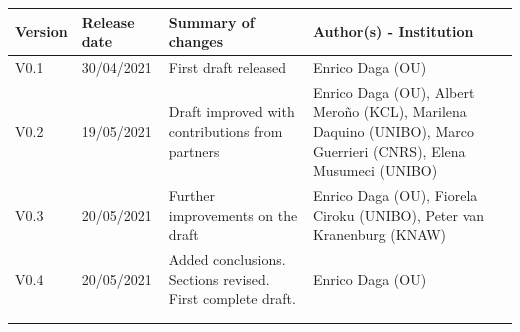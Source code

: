 \begin{tabular}{|l|l|p{5.5cm}|p{5.5cm}|}\hline
  \textbf{Version} & \textbf{Release date} & \textbf{Summary of changes} & \textbf{Author(s) - Institution}\\\hline  
  V0.1 & 30/04/2021 & First draft released & Enrico Daga (OU)\\\hline  
  V0.2 & 19/05/2021 & Draft improved with contributions from partners & Enrico Daga (OU), Albert Mero\~no (KCL), Marilena Daquino (UNIBO), Marco Guerrieri (CNRS), Elena Musumeci (UNIBO) \\\hline  
  V0.3 & 20/05/2021 & Further improvements on the draft & Enrico Daga (OU), Fiorela Ciroku (UNIBO), Peter van Kranenburg (KNAW) \\\hline  
  V0.4 & 20/05/2021 & Added conclusions. Sections revised. First complete draft. & Enrico Daga (OU) \\\hline  
  & & & \\\hline  
  & & & \\\hline  
  \end{tabular}

  \clearpage




